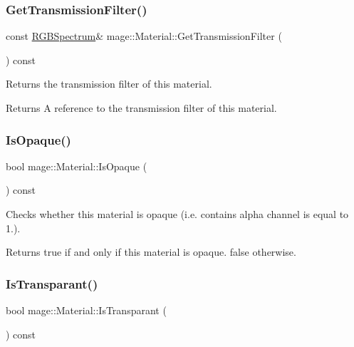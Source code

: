 \subsubsection{\texorpdfstring{Get\+Transmission\+Filter()}{GetTransmissionFilter()}\hspace{0.1cm}{\footnotesize\ttfamily [2/2]}}
{\footnotesize\ttfamily const \hyperlink{structmage_1_1_r_g_b_spectrum}{R\+G\+B\+Spectrum}\& mage\+::\+Material\+::\+Get\+Transmission\+Filter (\begin{DoxyParamCaption}{ }\end{DoxyParamCaption}) const\hspace{0.3cm}{\ttfamily [noexcept]}}

Returns the transmission filter of this material.

\begin{DoxyReturn}{Returns}
A reference to the transmission filter of this material. 
\end{DoxyReturn}
\hypertarget{structmage_1_1_material_a0df1804c29bfd9d2bbc606d6285dccec}{}\label{structmage_1_1_material_a0df1804c29bfd9d2bbc606d6285dccec} 
\subsubsection{\texorpdfstring{Is\+Opaque()}{IsOpaque()}}
{\footnotesize\ttfamily bool mage\+::\+Material\+::\+Is\+Opaque (\begin{DoxyParamCaption}{ }\end{DoxyParamCaption}) const\hspace{0.3cm}{\ttfamily [noexcept]}}

Checks whether this material is opaque (i.\+e. contains alpha channel is equal to 1.).

\begin{DoxyReturn}{Returns}
{\ttfamily true} if and only if this material is opaque. {\ttfamily false} otherwise. 
\end{DoxyReturn}
\hypertarget{structmage_1_1_material_a6a62e3889887e77259070e1f9cd9150f}{}\label{structmage_1_1_material_a6a62e3889887e77259070e1f9cd9150f} 
\subsubsection{\texorpdfstring{Is\+Transparant()}{IsTransparant()}}
{\footnotesize\ttfamily bool mage\+::\+Material\+::\+Is\+Transparant (\begin{DoxyParamCaption}{ }\end{DoxyParamCaption}) const\hspace{0.3cm}{\ttfamily [noexcept]}}

